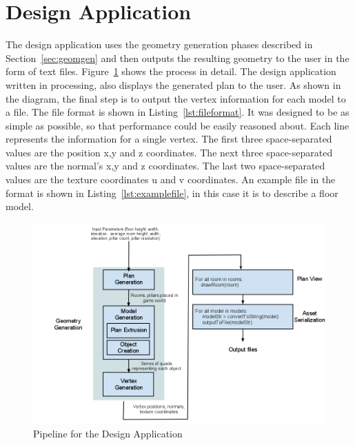 \section{Design Application}
\label{sec:design}
The design application uses the geometry generation phases described in Section~\ref{sec:geomgen} and then outputs the resulting geometry to the user in the form of text files.
Figure~\ref{fig:designpipeline} shows the process in detail.
The design application written in processing, also displays the generated plan to the user.
As shown in the diagram, the final step is to output the vertex information for each model to a file.
The file format is shown in Listing~\ref{lst:fileformat}.
It was designed to be as simple as possible, so that performance could be easily reasoned about.
Each line represents the information for a single vertex.
The first three space-separated values are the position x,y and z coordinates.
The next three space-separated values are the normal's x,y and z coordinates.
The last two space-separated values are the texture coordinates u and v coordinates.
An example file in the format is shown in Listing~\ref{lst:examplefile}, in this case it is to describe a floor model.

\begin{figure}
  \centering
  \includegraphics[width=1.0\textwidth]{images/procgl_designprog}
  \caption{Pipeline for the Design Application}
  \label{fig:designpipeline}
\end{figure}




